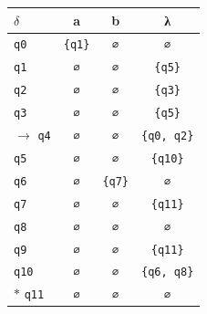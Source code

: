 \documentclass[11pt]{article}
\begin{document}
\begin{center}\small\begin{tabular}{lccc}\toprule
$\delta$ & a & b & λ \\\midrule
 \texttt{q0} & \texttt{\{q1\}} & \texttt{∅} & \texttt{∅} \\
 \texttt{q1} & \texttt{∅} & \texttt{∅} & \texttt{\{q5\}} \\
 \texttt{q2} & \texttt{∅} & \texttt{∅} & \texttt{\{q3\}} \\
 \texttt{q3} & \texttt{∅} & \texttt{∅} & \texttt{\{q5\}} \\
$\to$ \texttt{q4} & \texttt{∅} & \texttt{∅} & \texttt{\{q0, q2\}} \\
 \texttt{q5} & \texttt{∅} & \texttt{∅} & \texttt{\{q10\}} \\
 \texttt{q6} & \texttt{∅} & \texttt{\{q7\}} & \texttt{∅} \\
 \texttt{q7} & \texttt{∅} & \texttt{∅} & \texttt{\{q11\}} \\
 \texttt{q8} & \texttt{∅} & \texttt{∅} & \texttt{∅} \\
 \texttt{q9} & \texttt{∅} & \texttt{∅} & \texttt{\{q11\}} \\
 \texttt{q10} & \texttt{∅} & \texttt{∅} & \texttt{\{q6, q8\}} \\
$*$ \texttt{q11} & \texttt{∅} & \texttt{∅} & \texttt{∅} \\
\bottomrule\end{tabular}\end{center}
\end{document}
